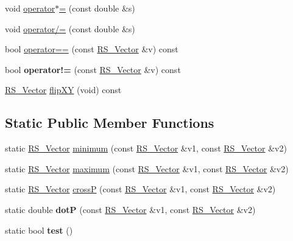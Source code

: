 \begin{DoxyCompactItemize}
\item 
void \hyperlink{classRS__Vector_a19a16a8a1f30f861ce30af326bc4bfb6}{operator$\ast$=} (const double \&s)
\item 
void \hyperlink{classRS__Vector_ac90452731480e599b033d45d9f9b5020}{operator/=} (const double \&s)
\item 
bool \hyperlink{classRS__Vector_abe3cbb071537621e39da1acdb3e33b47}{operator==} (const \hyperlink{classRS__Vector}{R\-S\-\_\-\-Vector} \&v) const 
\item 
\hypertarget{classRS__Vector_a12bfb0e59793801580c9d49cf0cc6801}{bool {\bfseries operator!=} (const \hyperlink{classRS__Vector}{R\-S\-\_\-\-Vector} \&v) const }\label{classRS__Vector_a12bfb0e59793801580c9d49cf0cc6801}

\item 
\hyperlink{classRS__Vector}{R\-S\-\_\-\-Vector} \hyperlink{classRS__Vector_a976e8deb29c882a8fb4e8c89a720cd80}{flip\-X\-Y} (void) const 
\end{DoxyCompactItemize}
\subsection*{Static Public Member Functions}
\begin{DoxyCompactItemize}
\item 
static \hyperlink{classRS__Vector}{R\-S\-\_\-\-Vector} \hyperlink{classRS__Vector_a49df5b48a2ef3ac495191f54b339bebb}{minimum} (const \hyperlink{classRS__Vector}{R\-S\-\_\-\-Vector} \&v1, const \hyperlink{classRS__Vector}{R\-S\-\_\-\-Vector} \&v2)
\item 
static \hyperlink{classRS__Vector}{R\-S\-\_\-\-Vector} \hyperlink{classRS__Vector_a03d486da18b0c893cf6a8b4b85dc38c5}{maximum} (const \hyperlink{classRS__Vector}{R\-S\-\_\-\-Vector} \&v1, const \hyperlink{classRS__Vector}{R\-S\-\_\-\-Vector} \&v2)
\item 
static \hyperlink{classRS__Vector}{R\-S\-\_\-\-Vector} \hyperlink{classRS__Vector_a5a1375e14d6f9ce1886555dbd5690027}{cross\-P} (const \hyperlink{classRS__Vector}{R\-S\-\_\-\-Vector} \&v1, const \hyperlink{classRS__Vector}{R\-S\-\_\-\-Vector} \&v2)
\item 
\hypertarget{classRS__Vector_a5f42090fc50593a60e4508cde0f23c00}{static double {\bfseries dot\-P} (const \hyperlink{classRS__Vector}{R\-S\-\_\-\-Vector} \&v1, const \hyperlink{classRS__Vector}{R\-S\-\_\-\-Vector} \&v2)}\label{classRS__Vector_a5f42090fc50593a60e4508cde0f23c00}

\item 
\hypertarget{classRS__Vector_a4a976b78f67964e2c0c4373be3e3242b}{static bool {\bfseries test} ()}\label{classRS__Vector_a4a976b78f67964e2c0c4373be3e3242b}

\end{DoxyCompactItemize}
